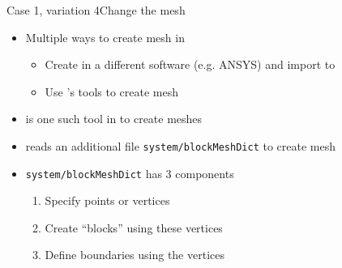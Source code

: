 \begin{frame}{Case 1, variation 4}{Change the mesh}
    \begin{itemize}
        \setitemsep{1em}
        \item Multiple ways to create mesh in \openfoam
        \begin{itemize}
            \item Create in a different software (e.g. ANSYS) and import to \openfoam
            \item Use \openfoam's tools to create mesh
        \end{itemize}
        \item<2-> \blockmesh{} is one such tool in \openfoam{} to create meshes
        \item<3-> \blockmesh{} reads an additional file \texttt{system/blockMeshDict} to create mesh
        \item<4-> \texttt{system/blockMeshDict} has 3 components
        \begin{enumerate}
            \item Specify points or vertices
            \item Create ``blocks'' using these vertices
            \item Define boundaries using the vertices
        \end{enumerate}
    \end{itemize}
\end{frame}

